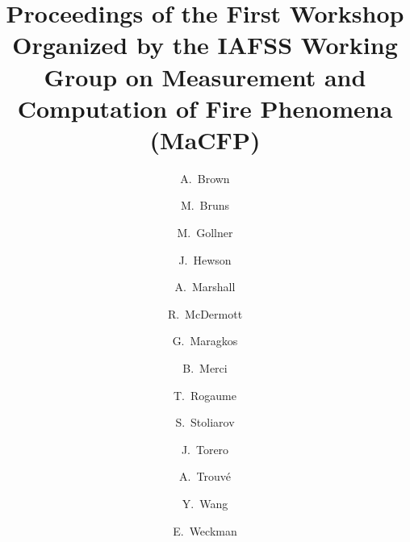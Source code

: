 \documentclass[review,11pt]{elsarticle}
\begin{document}
\begin{frontmatter}

\title{Proceedings of the First Workshop Organized by the IAFSS Working Group on Measurement and Computation of Fire Phenomena (MaCFP)}


\author[label:Sandia]{A.~Brown}
\author[label:NIST]{M.~Bruns}
\author[label:UMD]{M.~Gollner}
\author[label:Sandia]{J.~Hewson}
\author[label:UMD]{A.~Marshall}
\author[label:NIST]{R.~McDermott}
\author[label:Ghent]{G.~Maragkos}
\author[label:Ghent]{B.~Merci}
\author[label:Poitiers]{T.~Rogaume}
\author[label:UMD]{S.~Stoliarov}
\author[label:UMD]{J.~Torero}
\author[label:UMD]{A.~Trouv\'{e}}
\author[label:FM]{Y.~Wang}
\author[label:Waterloo]{E.~Weckman}

\address[label:Sandia]{Fire Science and Technology Department, Sandia National Laboratories, Albuquerque,~NM~87185,~USA}
\address[label:NIST]{Fire Research Division, National Institute of Standards and Technology, Gaithersburg,~MD~20899,~USA}
\address[label:UMD]{Department of Fire Protection Engineering, University of Maryland, College~Park,~MD~20742,~USA}
\address[label:Ghent]{Department of Flow, Heat and Combustion Mechanics, Ghent University-UGent,~B-9000~Ghent,~Belgium}
\address[label:Poitiers]{Institut Pprime (UPR 3346 CNRS), Universit\'{e} de Poitiers, Isae-ENSMA,~86961~Futuroscope~Chasseneuil~Cedex,~France}
\address[label:FM]{FM Global, Research Division, Norwood,~MA~02062,~USA}
\address[label:Waterloo]{Department of Mechanical and Mechatronics Engineering, University of Waterloo, Waterloo,~Ontario,~N2L~3G1,~Canada}


\begin{abstract}


\end{abstract}
\end{frontmatter}
\end{document}

